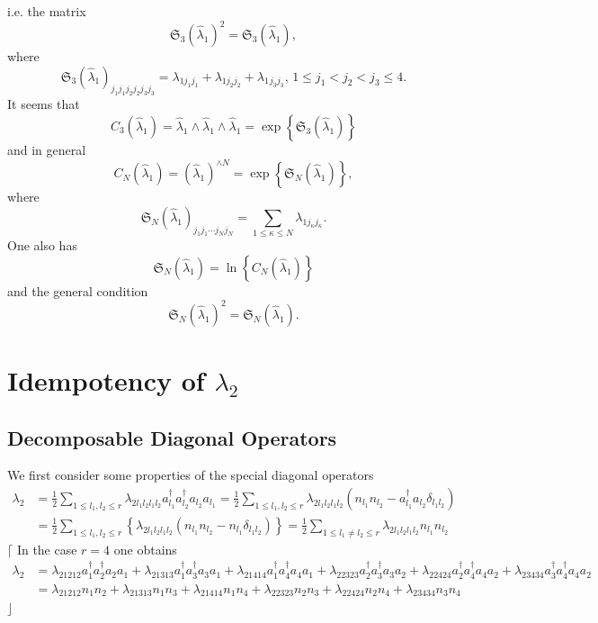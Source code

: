 \documentclass[aps,preprint]{revtex4}%
\begin{document}
i.e. the matrix
\[
\mathfrak{S}_{3}\left(  \hat{\lambda}_{1}\right)  ^{2}=\mathfrak{S}_{3}\left(
\hat{\lambda}_{1}\right)  ,
\]
where
\[
\mathfrak{S}_{3}\left(  \hat{\lambda}_{1}\right)  _{j_{1}j_{1}j_{2}j_{2}%
j_{3}j_{3}}=\lambda_{1j_{1}j_{1}}+\lambda_{1j_{2}j_{2}}+\lambda_{1}{}%
_{j_{3}j_{3}},\,1\leq j_{1}<j_{2}<j_{3}\leq4.
\]
It seems that
\[
C_{3}\left(  \hat{\lambda}_{1}\right)  =\hat{\lambda}_{1}\wedge\hat{\lambda
}_{1}\wedge\hat{\lambda}_{1}=\exp\left\{  \mathfrak{S}_{3}\left(  \hat
{\lambda}_{1}\right)  \right\}
\]
and in general
\[
C_{N}\left(  \hat{\lambda}_{1}\right)  =\left(  \hat{\lambda}_{1}\right)
^{\wedge N}=\exp\left\{  \mathfrak{S}_{N}\left(  \hat{\lambda}_{1}\right)
\right\}  ,
\]
where
\[
\mathfrak{S}_{N}\left(  \hat{\lambda}_{1}\right)  _{j_{1}j_{1}\cdots
j_{N}j_{N}}=\sum_{1\leq\kappa\leq N}\lambda_{1j_{\kappa}j_{\kappa}}.
\]
One also has%
\[
\mathfrak{S}_{N}\left(  \hat{\lambda}_{1}\right)  =\ln\left\{  C_{N}\left(
\hat{\lambda}_{1}\right)  \right\}
\]
and the general condition
\[
\mathfrak{S}_{N}\left(  \hat{\lambda}_{1}\right)  ^{2}=\mathfrak{S}_{N}\left(
\hat{\lambda}_{1}\right)  .
\]


\section{Idempotency of $\lambda_{2}$}

\subsection{Decomposable Diagonal Operators}

We first consider some properties of the special diagonal operators
\begin{align}
\lambda_{2}  &  =\frac{1}{2}\sum_{1\leq l_{1},l_{2}\leq r}\lambda_{2l_{1}%
l_{2}l_{1}l_{2}}a_{l_{1}}^{\dagger}a_{l_{2}}^{\dagger}a_{l_{2}}a_{l_{1}}%
=\frac{1}{2}\sum_{1\leq l_{1},l_{2}\leq r}\lambda_{2l_{1}l_{2}l_{1}l_{2}%
}\left(  n_{l_{1}}n_{l_{2}}-a_{l_{1}}^{\dagger}a_{l_{2}}\delta_{l_{1}l_{2}%
}\right) \nonumber\\
&  =\frac{1}{2}\sum_{1\leq l_{1},l_{2}\leq r}\left\{  \lambda_{2l_{1}%
l_{2}l_{1}l_{2}}\left(  n_{l_{1}}n_{l_{2}}-n_{l_{1}}\delta_{l_{1}l_{2}%
}\right)  \right\}  =\frac{1}{2}\sum_{1\leq l_{1}\neq l_{2}\leq r}%
\lambda_{2l_{1}l_{2}l_{1}l_{2}}n_{l_{1}}n_{l_{2}}%
\end{align}
$\lceil$ In the case $r=4$ one obtains%
\begin{align}
\lambda_{2}  &  =\lambda_{21212}a_{1}^{\dagger}a_{2}^{\dagger}a_{2}%
a_{1}+\lambda_{21313}a_{1}^{\dagger}a_{3}^{\dagger}a_{3}a_{1}+\lambda
_{21414}a_{1}^{\dagger}a_{4}^{\dagger}a_{4}a_{1}+\lambda_{22323}a_{2}%
^{\dagger}a_{3}^{\dagger}a_{3}a_{2}+\lambda_{22424}a_{2}^{\dagger}%
a_{4}^{\dagger}a_{4}a_{2}+\lambda_{23434}a_{3}^{\dagger}a_{4}^{\dagger}%
a_{4}a_{2}\nonumber\\
&  =\lambda_{21212}n_{1}n_{2}+\lambda_{21313}n_{1}n_{3}+\lambda_{21414}%
n_{1}n_{4}+\lambda_{22323}n_{2}n_{3}+\lambda_{22424}n_{2}n_{4}+\lambda
_{23434}n_{3}n_{4}%
\end{align}
$\rfloor$
\end{document}
